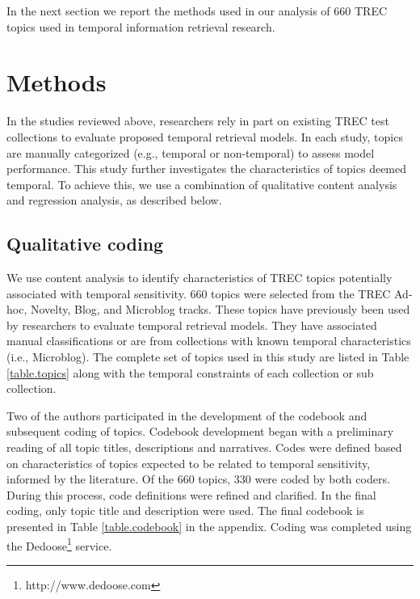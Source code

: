 \documentclass[runningheads,a4paper]{llncs}
\begin{document}
In the next section we report the methods used in our analysis of  660 TREC topics used in temporal information retrieval research. 

\section{Methods}

In the studies reviewed above, researchers rely in part on existing TREC test collections to evaluate proposed temporal retrieval models. In each study, topics are manually categorized (e.g.,  temporal or non-temporal) to assess model performance. This study further investigates the characteristics of topics deemed temporal. To achieve this, we use a combination of qualitative content analysis and regression analysis, as described below.

\subsection{Qualitative coding}
We use content analysis \cite{Krippendorff1980} to identify characteristics of TREC topics potentially associated with temporal sensitivity. 660 topics were selected from the TREC Ad-hoc, Novelty, Blog, and Microblog tracks. These topics have previously been used by researchers to evaluate temporal retrieval models. They have associated manual classifications or are from collections with known temporal characteristics (i.e., Microblog). The complete set of topics used in this study are listed in Table \ref{table.topics} along with the temporal constraints of each collection or sub collection.



Two of the authors participated in the development of the codebook and subsequent coding of topics. Codebook development began with a preliminary reading of all topic titles, descriptions and narratives. Codes were defined based on characteristics of topics expected to be related to temporal sensitivity, informed by the literature. Of the 660 topics, 330 were coded by both coders. During this process, code definitions were refined and clarified. In the final coding, only topic title and description were used. The final codebook is presented in Table \ref{table.codebook} in the appendix. Coding was completed using the Dedoose\footnote{http://www.dedoose.com} service.  
\end{document}
